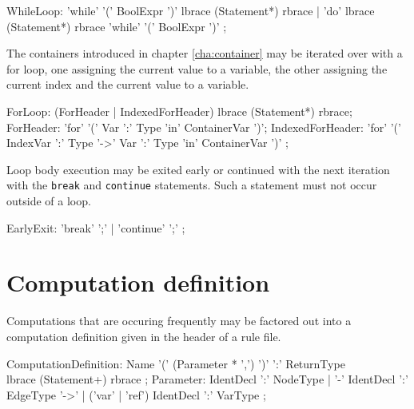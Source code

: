 \begin{rail} 
  WhileLoop: 
	'while' '(' BoolExpr ')' lbrace (Statement*) rbrace |
	'do' lbrace (Statement*) rbrace 'while' '(' BoolExpr ')' 
	;
\end{rail}


The containers introduced in chapter \ref{cha:container} may be iterated over with a for loop, one assigning the current value to a variable, the other assigning the current index and the current value to a variable.
\begin{rail}
  ForLoop: (ForHeader | IndexedForHeader) lbrace (Statement*) rbrace;
  ForHeader: 'for' '(' Var ':' Type 'in' ContainerVar ')';
  IndexedForHeader: 'for' '(' IndexVar ':' Type '->' Var ':' Type 'in' ContainerVar ')' ;
\end{rail}

Loop body execution may be exited early or continued with the next iteration with the \texttt{break} and \texttt{continue} statements. Such a statement must not occur outside of a loop.

\begin{rail} 
  EarlyExit: 
	'break' ';' |	'continue' ';'
	;
\end{rail}

\section{Computation definition} \label{sub:compdef}

Computations that are occuring frequently may be factored out into a computation definition given in the header of a rule file.
\begin{rail} 
  ComputationDefinition: 
	Name '(' (Parameter * ',') ')' ':' ReturnType \\
	lbrace (Statement+) rbrace
  ;
  Parameter: IdentDecl ':' NodeType |
  '-' IdentDecl ':' EdgeType '->' |
  ('var' | 'ref') IdentDecl ':' VarType
	;
\end{rail}

